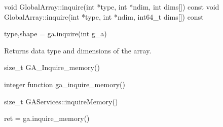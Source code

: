 \documentclass[12pt]{article}
\begin{document}
\begin{cxxapi}
\begin{cxxcode}
void GlobalArray::inquire(int *type, int *ndim, int dims[]) const
void GlobalArray::inquire(int *type, int *ndim, int64_t dims[]) const
\end{cxxcode}
\begin{funcargs}
\end{funcargs}
\end{cxxapi}

\begin{pyapi}
\begin{pycode}
type,shape = ga.inquire(int g_a)
\end{pycode}
\begin{funcargs}
\end{funcargs}
\end{pyapi}

\local

\begin{desc}

Returns data type and dimensions of the array.

\end{desc}


\begin{capi}
\begin{ccode}
size_t GA_Inquire_memory()
\end{ccode}
\end{capi}

\begin{fapi}
\begin{fcode}
integer function ga_inquire_memory()
\end{fcode}
\end{fapi}

\begin{cxxapi}
\begin{cxxcode}
size_t GAServices::inquireMemory()
\end{cxxcode}
\end{cxxapi}

\begin{pyapi}
\begin{pycode}
ret = ga.inquire_memory()
\end{pycode}
\end{pyapi}
\end{document}
